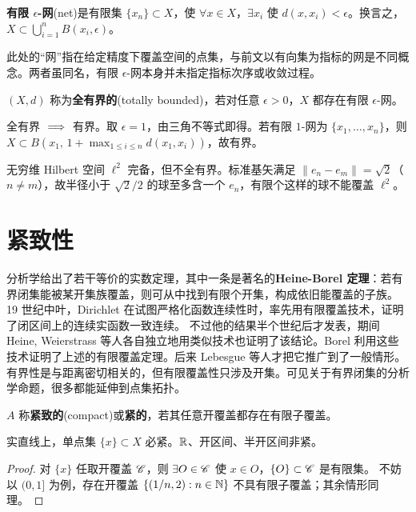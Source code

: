 
\begin{definition}
    \textbf{有限 $\epsilon$-网}(net)是有限集 $\{x_n\}\subset X$，使 $\forall x\in X$，$\exists x_i$ 使 $d(x,x_i)<\epsilon$。换言之，$X\subset\bigcup_{i=1}^n B(x_i,\epsilon)$。
\end{definition}

此处的“网”指在给定精度下覆盖空间的点集，与前文以有向集为指标的网是不同概念。两者虽同名，有限 $\epsilon$-网本身并未指定指标次序或收敛过程。

\begin{definition}
    $(X,d)$ 称为\textbf{全有界的}(totally bounded)，若对任意 $\epsilon>0$，$X$ 都存在有限 $\epsilon$-网。
\end{definition}

\begin{remark}
    全有界 $\implies$ 有界。取 $\epsilon=1$，由三角不等式即得。若有限 $1$-网为 $\{x_1,\ldots,x_n\}$，则 $X\subset B (x_1,\,1+\max_{1\le i\le n}d(x_1,x_i) )$，故有界。
\end{remark}

\begin{example}
    无穷维 Hilbert 空间 $\ell^2$ 完备，但不全有界。标准基矢满足 $\|e_n-e_m\|=\sqrt2$（$n\ne m$），故半径小于 $\sqrt2/2$ 的球至多含一个 $e_n$，有限个这样的球不能覆盖 $\ell^2$。
\end{example}


\section{紧致性}\label{sec:topological-compactness}

分析学给出了若干等价的实数定理，其中一条是著名的\textbf{Heine-Borel 定理}：若有界闭集能被某开集族覆盖，则可从中找到有限个开集，构成依旧能覆盖的子族。
19 世纪中叶，Dirichlet 在试图严格化函数连续性时，率先用有限覆盖技术，证明了闭区间上的连续实函数一致连续。
不过他的结果半个世纪后才发表，期间 Heine, Weierstrass 等人各自独立地用类似技术也证明了该结论。Borel 利用这些技术证明了上述的有限覆盖定理。后来 Lebesgue 等人才把它推广到了一般情形。
有界性是与距离密切相关的，但有限覆盖性只涉及开集。可见关于有界闭集的分析学命题，很多都能延伸到点集拓扑。

\begin{definition}
    $A$ 称\textbf{紧致的}(compact)或\textbf{紧的}，若其任意开覆盖都存在有限子覆盖。
\end{definition}

\begin{example}
    实直线上，单点集 $\{x\}\subset X$ 必紧。$\mathbb{R}$、开区间、半开区间非紧。
\end{example}
\begin{proof}
    对 $\{x\}$ 任取开覆盖 $\mathscr C$，则 $\exists O\in\mathscr C$ 使 $x\in O$，$\{O\}\subset\mathscr C$ 是有限集。
    不妨以 $(0,1]$ 为例，存在开覆盖 $\{(1/n,2):n\in\mathbb{N}\}$ 不具有限子覆盖；其余情形同理。
\end{proof}

